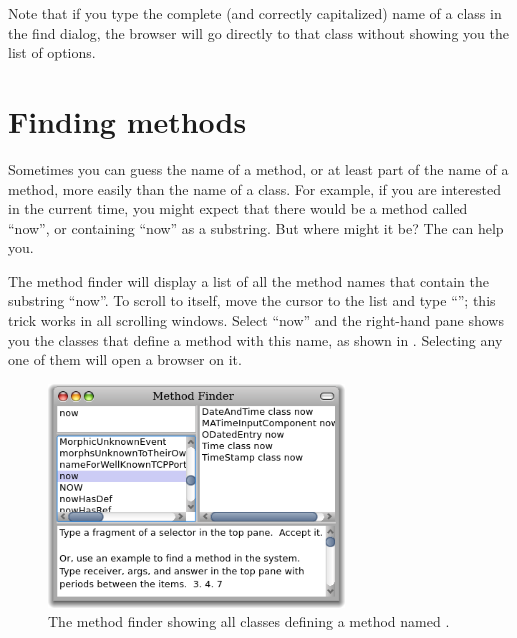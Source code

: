 \documentclass[a4paper,10pt,twoside]{book}
\begin{document}
Note that if you type the complete (and correctly capitalized) name of a class in the find dialog, the browser will go directly to that class without showing you the list of options.

\section{Finding methods}
\label{sec:quick:methodFinder}

Sometimes you can guess the name of a method, or at least part of the name of a method, more easily than the name of a class.  For example, if you are interested in the current time, you might expect that there would be a method called ``now'', or containing ``now'' as a substring.   But where might it be?
The  can help you.

The method finder will display a list of all the method names that contain the substring ``now''.  
To scroll to  itself, move the cursor to the list and type ``''; this trick works in all scrolling windows.  Select ``now'' and the right-hand pane shows you the classes that define a method with this name, as shown in .  Selecting any one of them will open a browser on it.

\begin{figure}[hbt]
\centerline {\includegraphics[width=0.7\textwidth]{methodFinder-now}}
\caption{The method finder showing all classes defining a method named .
\label{fig:MethodFinder}}
\end{figure}
\end{document}
